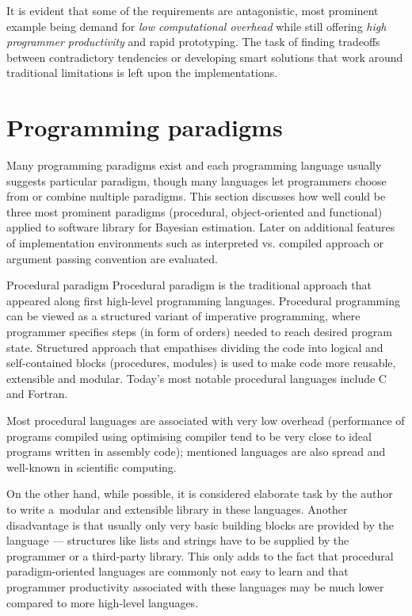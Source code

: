 It is evident that some of the requirements are antagonistic, most prominent example being demand
for \emph{low computational overhead} while still offering \emph{high programmer productivity} and
rapid prototyping. The task of finding tradeoffs between contradictory tendencies or developing smart
solutions that work around traditional limitations is left upon the implementations.

\section{Programming paradigms}

Many programming paradigms exist and each programming language usually suggests particular paradigm,
though many languages let programmers choose from or combine multiple paradigms. This section
discusses how well could be three most prominent paradigms (procedural, object-oriented and
functional) applied to software library for Bayesian estimation. Later on additional features of
implementation environments such as interpreted vs. compiled approach or argument passing convention
are evaluated.

\begin{subsection}{Procedural paradigm}
	Procedural paradigm is the traditional approach that appeared along first high-level programming languages.
	Procedural programming can be viewed as a structured variant of imperative programming, where
	programmer specifies steps (in form of orders) needed to reach desired program state.
	Structured approach that empathises dividing the code into logical and self-contained
	blocks (procedures, modules) is used to make code more reusable, extensible and modular.
	Today's most notable procedural languages include C and Fortran.

	Most procedural languages are associated with very low overhead (performance of programs
	compiled using optimising compiler tend to be very close to ideal programs written in
	assembly code); mentioned languages are also spread and well-known in scientific computing.

	On the other hand, while possible, it is considered elaborate task by the author to write
	a~modular and extensible library in these languages. Another disadvantage is that
	usually only very basic building blocks are provided by the language --- structures like
	lists and strings have to be supplied by the programmer or a third-party library. This only
	adds to the fact that procedural paradigm-oriented languages are commonly not easy to learn
	and that programmer productivity associated with these languages may be much lower compared
	to more high-level languages.
\end{subsection}

